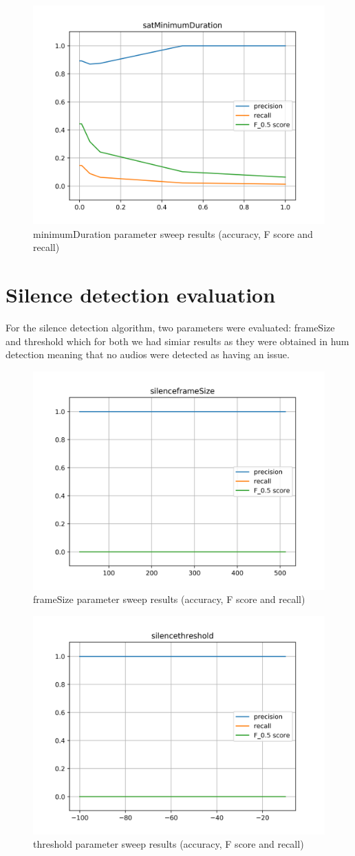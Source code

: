 \begin{figure}[H]
	\includegraphics[clip,width=0.7\columnwidth]{Figures/satMinimumDuration.png}%
	\caption{minimumDuration parameter sweep results (accuracy, F score and recall)}
	\label{fig:satMinimumDuration}
\end{figure}

\section{Silence detection evaluation}
For the silence detection algorithm, two parameters were evaluated: frameSize and threshold which for both we had simiar results as they were obtained in hum detection meaning that no audios were detected as having an issue.

\begin{figure}[H]
	\includegraphics[clip,width=0.7\columnwidth]{Figures/silenceframeSize.png}%
	\caption{frameSize parameter sweep results (accuracy, F score and recall)}
	\label{fig:silenceframeSize}
\end{figure}

\begin{figure}[H]
	\includegraphics[clip,width=0.7\columnwidth]{Figures/silencethreshold.png}%
	\caption{threshold parameter sweep results (accuracy, F score and recall)}
	\label{fig:silencethreshold}
\end{figure}

\newpage


